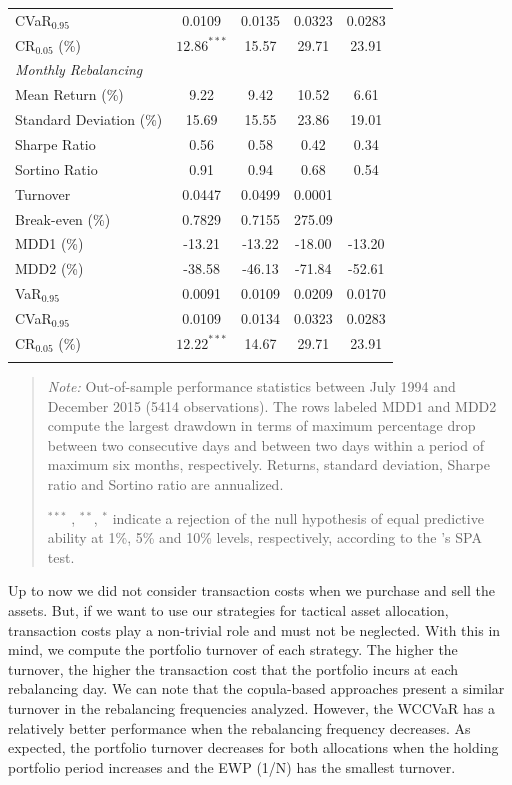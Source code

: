 \documentclass[a4paper,10pt]{article}
\begin{document}
\begin{table}[!ht]
\begin{tabularx}{\textwidth}{@{\extracolsep{\fill}}lcccc@{}}
		CVaR$_{0.95}$ & 0.0109 & 0.0135 & 0.0323 & 0.0283 \\
		CR$_{0.05}$ (\%) & $12.86^{***}$ & 15.57 & 29.71  & 23.91  \\
		\midrule[\heavyrulewidth] \textit{Monthly Rebalancing} &  &  &  &  \\
		\midrule[\heavyrulewidth] Mean Return (\%) & 9.22 & 9.42 & 10.52 & 6.61
		\\
		Standard Deviation (\%) & 15.69 & 15.55 & 23.86 & 19.01 \\
		Sharpe Ratio & 0.56 & 0.58 & 0.42 & 0.34 \\
		Sortino Ratio & 0.91 & 0.94 & 0.68 & 0.54 \\
		Turnover & 0.0447 & 0.0499 & 0.0001 &  \\
		Break-even (\%) &  0.7829 & 0.7155 & 275.09 &  \\
		MDD1 (\%) & -13.21 & -13.22 & -18.00 & -13.20 \\
		MDD2 (\%) & -38.58 & -46.13 & -71.84 & -52.61 \\
		VaR$_{0.95}$ &  0.0091 & 0.0109 & 0.0209  & 0.0170 \\
		CVaR$_{0.95}$ & 0.0109 & 0.0134 & 0.0323 & 0.0283 \\
		CR$_{0.05}$ (\%) & $12.22^{***}$ & 14.67 & 29.71  & 23.91  \\
		\bottomrule &  &  &  &
	\end{tabularx}%
	\begin{quote}
		\textit{Note:} \scriptsize Out-of-sample performance statistics between July 1994 and December 2015 (5414 observations). The rows labeled MDD1 and MDD2 compute the largest drawdown in terms of maximum percentage drop between two consecutive days and between two days within a period of maximum six months, respectively. Returns, standard deviation, Sharpe ratio and Sortino ratio are annualized.
		\item \scriptsize $^{\ast\ast\ast}$ , $^{\ast\ast}$, $^{\ast}$ indicate a rejection of the null hypothesis of equal predictive ability at 1\%, 5\% and 10\% levels, respectively, according to the \citet*{hansen2005test}'s SPA test.
	\end{quote}
	\label{tab:table01}%
\end{table}


Up to now we did not consider transaction costs when we purchase and sell the assets. But, if we want to use our strategies for tactical asset allocation, transaction costs play a non-trivial role and must not be neglected. With this in mind, we compute the portfolio turnover of each strategy. The higher the turnover, the higher the transaction cost that the portfolio incurs at each rebalancing day. We can note that the copula-based approaches present a similar turnover in the rebalancing frequencies analyzed. However, the WCCVaR has a relatively better performance when the rebalancing frequency decreases. As expected, the portfolio turnover decreases for both allocations when the holding portfolio period increases and the EWP (1/N) has the smallest turnover.
\end{document}
